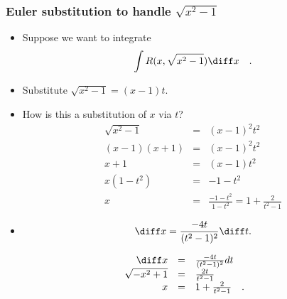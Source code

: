 \begin{frame}

\frametitle{Euler substitution to handle $\sqrt{x^2-1} $}

\begin{itemize}
\item<1-> Suppose we want to integrate 
\[
\int R(x, \sqrt{x^2-1})\diff x\quad .
\]
\item<2-> Substitute $\sqrt{x^2-1}=(x-1)t$. 
\item<3-> How is this a substitution of $x$ via $t$? \[
\begin{array}{rcl}
\sqrt{x^2-1}&=&(x-1)^2t^2\\
(x-1)(x+1)  &=&(x-1)^2t^2\\
x+1 &=&(x-1)t^2\\
x(1-t^2) &=&-1-t^2\\
x&=&\frac{-1-t^2}{1-t^2}=1+\frac{2}{t^2-1}
\end{array}
\]
\item<7->
\[
\diff x=\frac{-4t}{(t^2-1)^2}\diff t.
\] 
\end{itemize}
\begin{definition}
\[
\begin{array}{rcl}
\diff x&=&\frac{-4t}{(t^2-1)^2}dt\\
\sqrt{-x^2+1}&=&\frac{2t}{t^2-1} \\
x&=&1+\frac{2}{t^2-1}\quad .
\end{array}
\] 
\end{definition}

\end{frame}
